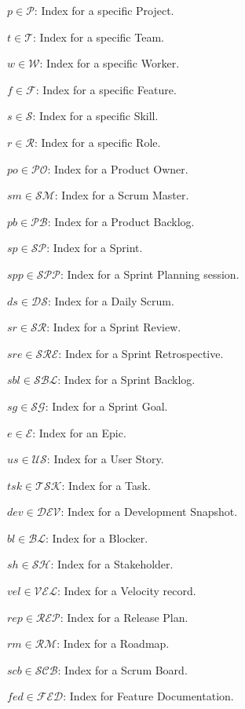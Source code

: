 \documentclass[12pt]{article}
\begin{document}
\item $ p \in \mathcal{P} $: Index for a specific Project.
    \item $ t \in \mathcal{T} $: Index for a specific Team.
    \item $ w \in \mathcal{W} $: Index for a specific Worker.
    \item $ f \in \mathcal{F} $: Index for a specific Feature.
    \item $ s \in \mathcal{S} $: Index for a specific Skill.
    \item $ r \in \mathcal{R} $: Index for a specific Role.
    \item $ po \in \mathcal{PO} $: Index for a Product Owner.
    \item $ sm \in \mathcal{SM} $: Index for a Scrum Master.
    \item $ pb \in \mathcal{PB} $: Index for a Product Backlog.
    \item $ sp \in \mathcal{SP} $: Index for a Sprint.
    \item $ spp \in \mathcal{SPP} $: Index for a Sprint Planning session.
    \item $ ds \in \mathcal{DS} $: Index for a Daily Scrum.
    \item $ sr \in \mathcal{SR} $: Index for a Sprint Review.
    \item $ sre \in \mathcal{SRE} $: Index for a Sprint Retrospective.
    \item $ sbl \in \mathcal{SBL} $: Index for a Sprint Backlog.
    \item $ sg \in \mathcal{SG} $: Index for a Sprint Goal.
    \item $ e \in \mathcal{E} $: Index for an Epic.
    \item $ us \in \mathcal{US} $: Index for a User Story.
    \item $ tsk \in \mathcal{TSK} $: Index for a Task.
    \item $ dev \in \mathcal{DEV} $: Index for a Development Snapshot.
    \item $ bl \in \mathcal{BL} $: Index for a Blocker.
    \item $ sh \in \mathcal{SH} $: Index for a Stakeholder.
    \item $ vel \in \mathcal{VEL} $: Index for a Velocity record.
    \item $ rep \in \mathcal{REP} $: Index for a Release Plan.
    \item $ rm \in \mathcal{RM} $: Index for a Roadmap.
    \item $ scb \in \mathcal{SCB} $: Index for a Scrum Board.
    \item $ fed \in \mathcal{FED} $: Index for Feature Documentation.
\end{document}
